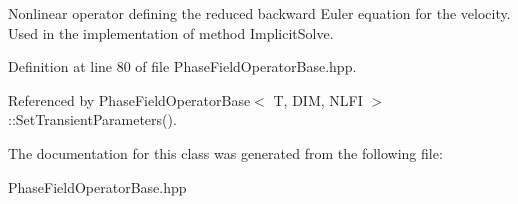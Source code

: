 Nonlinear operator defining the reduced backward Euler equation for the velocity. Used in the implementation of method Implicit\+Solve. 

Definition at line 80 of file Phase\+Field\+Operator\+Base.\+hpp.



Referenced by Phase\+Field\+Operator\+Base$<$ T, D\+I\+M, N\+L\+F\+I $>$\+::\+Set\+Transient\+Parameters().



The documentation for this class was generated from the following file\+:\begin{DoxyCompactItemize}
\item 
Phase\+Field\+Operator\+Base.\+hpp\end{DoxyCompactItemize}
